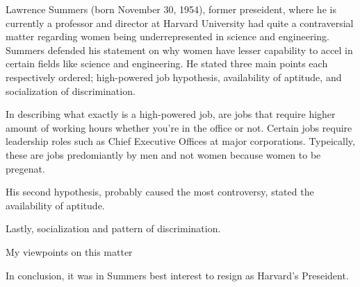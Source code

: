 \documentclass[12pt,legalpaper]{article}
\begin{document}



\par
Lawrence Summers (born November 30, 1954), former preseident, where he is currently a professor and director at 
Harvard University had quite a contraversial matter regarding women being underrepresented in science and engineering.
Summers defended his statement on why women have lesser capability to accel in certain fields like science and engineering.
He stated three main points each respectively ordered; high-powered job hypothesis, availability of aptitude, and socialization of
discrimination.\cite{lawrencesummers}

\par
In describing what exactly is a high-powered job, are jobs that require higher amount of working hours whether you're
in the office or not. Certain jobs require leadership roles such as Chief Executive Offices at major corporations.
Typeically, these are jobs predomiantly by men and not women because women  to be pregenat.

\par
His second hypothesis, probably caused the most controversy, stated the availability of aptitude.

\par
Lastly, socialization and pattern of discrimination.

\par
My viewpoints on this matter

\par
In conclusion, it was in Summers best interest to resign as Harvard's Preseident.

\clearpage
\printbibliography\
\end{document}
